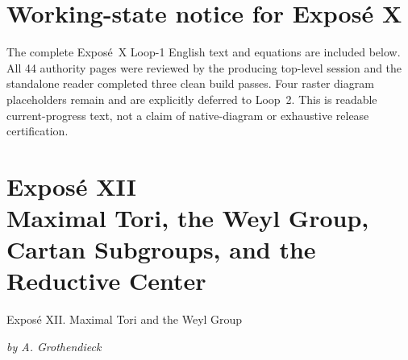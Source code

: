 \documentclass[11pt,a4paper,oneside]{book}
\begin{document}
\clearpage
\chapter*{Working-state notice for Expos\'e X}
The complete Expos\'e~X Loop-1 English text and equations are included below.
All 44 authority pages were reviewed by the producing top-level session and
the standalone reader completed three clean build passes. Four raster
diagram placeholders remain and are explicitly deferred to Loop~2. This is
readable current-progress text, not a claim of native-diagram or exhaustive
release certification.




\clearpage
{}
\makeatletter
\tagsleft@true
\let\veqno\@@leqno
\makeatother











\makeatletter
\tagsleft@false
\let\veqno\@@eqno
\makeatother
\restoregeometry

\clearpage
{}
\makeatletter
\tagsleft@true
\let\veqno\@@leqno
\makeatother
\setcounter{section}{0}
\chapter*{Expos\'e XII\\
  Maximal Tori, the Weyl Group, Cartan Subgroups, and the Reductive Center}
  {Expos\'e XII. Maximal Tori and the Weyl Group}
\begin{center}
  \textit{by A. Grothendieck}
\end{center}



\makeatletter
\tagsleft@false
\let\veqno\@@eqno
\makeatother
\restoregeometry
\end{document}
